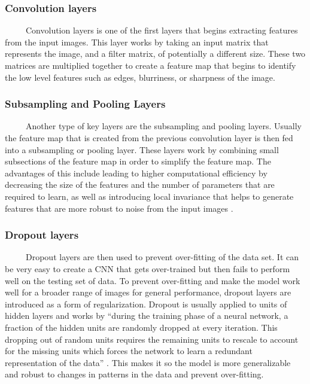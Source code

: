 \documentclass[12pt]{article}
\begin{document}
\hypertarget{convolution-layers}{%
\subsubsection{Convolution layers}\label{convolution-layers}}

~~~~~Convolution layers is one of the first layers that begins
extracting features from the input images. This layer works by taking an
input matrix that represents the image, and a filter matrix, of
potentially a different size. These two matrices are multiplied together
to create a feature map that begins to identify the low level features
such as edges, blurriness, or sharpness of the image.

\hypertarget{subsampling-and-pooling-layers}{%
\subsubsection{Subsampling and Pooling
Layers}\label{subsampling-and-pooling-layers}}

~~~~~Another type of key layers are the subsampling and pooling layers.
Usually the feature map that is created from the previous convolution
layer is then fed into a subsampling or pooling layer. These layers work
by combining small subsections of the feature map in order to simplify
the feature map. The advantages of this include leading to higher
computational efficiency by decreasing the size of the features and the
number of parameters that are required to learn, as well as introducing
local invariance that helps to generate features that are more robust to
noise from the input images \citep{Mathworks}.

\hypertarget{dropout-layers}{%
\subsubsection{Dropout layers}\label{dropout-layers}}

~~~~~Dropout layers are then used to prevent over-fitting of the data
set. It can be very easy to create a CNN that gets over-trained but then
fails to perform well on the testing set of data. To prevent
over-fitting and make the model work well for a broader range of images
for general performance, dropout layers are introduced as a form of
regularization. Dropout is usually applied to units of hidden layers and
works by ``during the training phase of a neural network, a fraction of
the hidden units are randomly dropped at every iteration. This dropping
out of random units requires the remaining units to rescale to account
for the missing units which forces the network to learn a redundant
representation of the data'' \citep{PML}. This makes it so the model is
more generalizable and robust to changes in patterns in the data and
prevent over-fitting.
\end{document}
